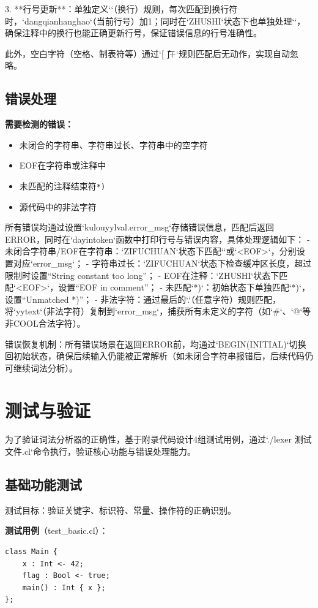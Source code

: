 \documentclass[twocolumn]{article}
\begin{document}
3. **行号更新**：单独定义`\n`（换行）规则，每次匹配到换行符时，`dangqianhanghao`（当前行号）加1；同时在`ZHUSHI`状态下也单独处理`\n`，确保注释中的换行也能正确更新行号，保证错误信息的行号准确性。

此外，空白字符（空格、制表符等）通过`[ \f\r\t\v]+`规则匹配后无动作，实现自动忽略。

\subsection{错误处理}

\textbf{需要检测的错误：}
\begin{itemize}
    \item 未闭合的字符串、字符串过长、字符串中的空字符
    \item EOF在字符串或注释中
    \item 未匹配的注释结束符\texttt{*)}
    \item 源代码中的非法字符
\end{itemize}

所有错误均通过设置`kulouyylval.error_msg`存储错误信息，匹配后返回ERROR，同时在`dayintoken`函数中打印行号与错误内容，具体处理逻辑如下：
- 未闭合字符串/EOF在字符串：`ZIFUCHUAN`状态下匹配`\n`或`<EOF>`，分别设置对应`error_msg`；
- 字符串过长：`ZIFUCHUAN`状态下检查缓冲区长度，超过限制时设置“String constant too long”；
- EOF在注释：`ZHUSHI`状态下匹配`<EOF>`，设置“EOF in comment”；
- 未匹配`*)`：初始状态下单独匹配`*)`，设置“Unmatched *)”；
- 非法字符：通过最后的`.`（任意字符）规则匹配，将`yytext`（非法字符）复制到`error_msg`，捕获所有未定义的字符（如`#`、`@`等非COOL合法字符）。

错误恢复机制：所有错误场景在返回ERROR前，均通过`BEGIN(INITIAL)`切换回初始状态，确保后续输入仍能被正常解析（如未闭合字符串报错后，后续代码仍可继续词法分析）。


\section{测试与验证}
为了验证词法分析器的正确性，基于附录代码设计4组测试用例，通过`./lexer 测试文件.cl`命令执行，验证核心功能与错误处理能力。

\subsection{基础功能测试}

测试目标：验证关键字、标识符、常量、操作符的正确识别。

\textbf{测试用例}（test\_basic.cl）：
\begin{lstlisting}[language=cool, caption={基础功能测试}]
class Main {
    x : Int <- 42;
    flag : Bool <- true;
    main() : Int { x };
};
\end{lstlisting}
\end{document}
